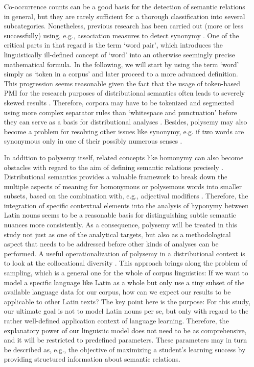 Co-occurrence counts can be a good basis for the detection of semantic relations in general, but they are rarely sufficient for a thorough classification into several subcategories. Nonetheless, previous research has been carried out (more or less successfully) using, e.g., association measures to detect synonymy \parencite[566]{hagiwaraSupervisedSynonymAcquisition2009}. One of the critical parts in that regard is the term `word pair', which introduces the linguistically ill-defined concept of `word' into an otherwise seemingly precise mathematical formula. In the following, we will start by using the term `word' simply as `token in a corpus' and later proceed to a more advanced definition. This progression seems reasonable given the fact that the usage of token-based \gls{PMI} for the research purposes of distributional semantics often leads to severely skewed results \parencite[444]{herbelotMeasuringSemanticContent2013}. Therefore, corpora may have to be tokenized and segmented using more complex separator rules than `whitespace and punctuation' before they can serve as a basis for distributional analyses \parencite[6]{mikolovDistributedRepresentationsWords2013}. Besides, polysemy may also become a problem for resolving other issues like synonymy, e.g. if two words are synonymous only in one of their possibly numerous senses \parencite[444]{herbelotMeasuringSemanticContent2013}. 

In addition to polysemy itself, related concepts like homonymy can also become obstacles with regard to the aim of defining semantic relations precisely \parencite[251]{gardnerValidatingConstructWord2007}. Distributional semantics provides a valuable framework to break down the multiple aspects of meaning for homonymous or polysemous words into smaller subsets, based on the combination with, e.g., adjectival modifiers \parencite[42]{boledaIntensionalityWasOnly2013}. Therefore, the integration of specific contextual elements into the analysis of hyponymy between Latin nouns seems to be a reasonable basis for distinguishing subtle semantic nuances more consistently. As a consequence, polysemy will be treated in this study not just as one of the analytical targets, but also as a methodological aspect that needs to be addressed before other kinds of analyses can be performed. A useful operationalization of polysemy in a distributional context is to look at the collocational diversity \parencite[8]{hamiltonDiachronicWordEmbeddings2016}. This approach brings along the problem of sampling, which is a general one for the whole of corpus linguistics: If we want to model a specific language like Latin as a whole but only use a tiny subset of the available language data for our corpus, how can we expect our results to be applicable to other Latin texts? The key point here is the purpose: For this study, our ultimate goal is not to model Latin nouns per se, but only with regard to the rather well-defined application context of language learning. Therefore, the explanatory power of our linguistic model does not need to be as comprehensive, and it will be restricted to predefined parameters. These parameters may in turn be described as, e.g., the objective of maximizing a student's learning success by providing structured information about semantic relations.

